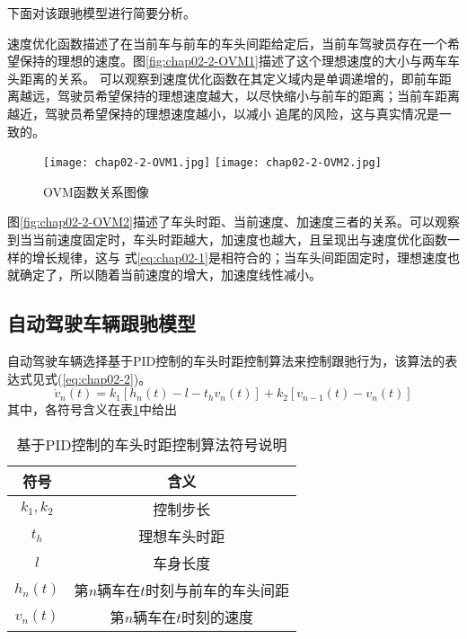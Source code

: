 下面对该跟驰模型进行简要分析。

速度优化函数描述了在当前车与前车的车头间距给定后，当前车驾驶员存在一个希望保持的理想的速度。图\ref{fig:chap02-2-OVM1}描述了这个理想速度的大小与两车车头距离的关系。
可以观察到速度优化函数在其定义域内是单调递增的，即前车距离越远，驾驶员希望保持的理想速度越大，以尽快缩小与前车的距离；当前车距离越近，驾驶员希望保持的理想速度越小，以减小
追尾的风险，这与真实情况是一致的。

\begin{figure}
  \centering
    {\texttt{[image: chap02-2-OVM1.jpg]}}
    {\texttt{[image: chap02-2-OVM2.jpg]}}
  \caption{OVM函数关系图像}
  \label{fig:chap02-2-OVM}
\end{figure}

图\ref{fig:chap02-2-OVM2}描述了车头时距、当前速度、加速度三者的关系。可以观察到当当前速度固定时，车头时距越大，加速度也越大，且呈现出与速度优化函数一样的增长规律，这与
式\ref{eq:chap02-1}是相符合的；当车头间距固定时，理想速度也就确定了，所以随着当前速度的增大，加速度线性减小。

\subsection{自动驾驶车辆跟驰模型}

自动驾驶车辆选择基于PID控制的车头时距控制算法来控制跟驰行为，该算法的表达式见式(\ref{eq:chap02-2})。
\begin{equation}
  \dot{v}_n(t) = k_1 \left[ h_n(t) - l - t_hv_n(t) \right] + k_2 \left[ v_{n-1}(t) - v_n(t) \right]
  \label{eq:chap02-2}
\end{equation}
其中，各符号含义在表\ref{tab:chap02-2}中给出

\begin{table}
  \centering
  \caption{基于PID控制的车头时距控制算法符号说明}
  \begin{tabular}{cc}
    \toprule
    符号          &  含义                         \\
    \midrule
    $k_1, k_2$            & 控制步长         \\
    $t_h$                 & 理想车头时距             \\
    $l$                   & 车身长度          \\
    $h_n(t)$              & 第$n$辆车在$t$时刻与前车的车头间距        \\
    $v_n(t)$              & 第$n$辆车在$t$时刻的速度 \\
    \bottomrule
  \end{tabular}
  \label{tab:chap02-2}
\end{table}

